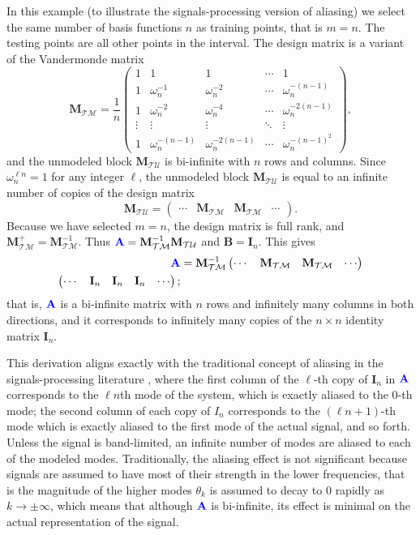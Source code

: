 \documentclass[twocolumn,aps,prx,superscriptaddress,10pt]{revtex4-2}
\newcommand{\0}{\bm{0}}
\newcommand{\M}{\mathcal{M}} %
\newcommand{\T}{\mathcal{T}} %
\newcommand{\U}{\mathcal{U}} %
\newcommand{\bbA}{{\color{blue}{\mathbf{A}}}}  %
\newcommand{\bbB}{\mathbf{B}}
\newcommand{\bbI}{\mathbf{I}}
\newcommand{\bbM}{\mathbf{M}}
\newcommand{\MTM}{\bbM_{\T\M}}
\newcommand{\MTU}{\bbM_{\T\U}}
\begin{document}
In this example (to illustrate the signals-processing version of aliasing) we select the same number of basis functions $n$ as training points, that is  $m=n$.  The testing points are all other points in the interval. 
The design matrix is a variant of the Vandermonde matrix 
\begin{equation}
    \MTM = \frac{1}{n}\begin{pmatrix}
        1 & 1 & 1 & \cdots & 1\\
        1 & \omega_n^{-1} & \omega_n^{-2} & \cdots & \omega_n^{-(n-1)}\\
        1 & \omega_n^{-2} & \omega_n^{-4} & \cdots & \omega_n^{-2(n-1)}\\
        \vdots & \vdots & \vdots & \ddots & \vdots\\
        1 & \omega_n^{-(n-1)} & \omega_n^{-2(n-1)} & \cdots & \omega_n^{-(n-1)^2}
    \end{pmatrix},
\end{equation}
and the unmodeled block  $\MTU$ is bi-infinite with $n$ rows and columns. 
Since  $\omega_n^{\ell n} = 1$ for any integer $\ell$, the unmodeled block $\MTU$ is equal to an infinite number of copies of the design matrix
\[
\MTU = \begin{pmatrix}\cdots & \MTM & \MTM & \cdots \end{pmatrix}.
\]
Because we have selected $m=n$, the design matrix is full rank, and $\MTM^+ = \MTM^{-1}$.  
Thus $\bbA = \MTM^{-1} \MTU$ and $\bbB = \bbI_n$. 
This gives 
\begin{align}
    \bbA 
    &= \MTM^{-1} \begin{pmatrix} \cdots & \MTM & \MTM & \cdots \end{pmatrix} \\   
    \begin{pmatrix}
      \cdots &   \bbI_n & \bbI_n & \bbI_n & \cdots
    \end{pmatrix};
\end{align}
that is, $\bbA$ is a bi-infinite matrix  with $n$ rows and infinitely many columns in both directions, and it corresponds to infinitely many copies of the $n\times n$ identity matrix $\bbI_n$.

This derivation aligns exactly with the traditional concept of aliasing in the signals-processing literature \cite{roberts1987digital}, where the first column of the $\ell$-th copy of $\bbI_n$ in $\bbA$ corresponds to the $\ell n$th mode of the system, which is exactly aliased to the $0$-th mode; the second column of each copy of $I_n$ corresponds to the $(\ell n+1)$-th mode which is exactly aliased to the first mode of the actual signal, and so forth.  Unless the signal is band-limited, an infinite number of modes are aliased to each of the modeled modes.  Traditionally, the aliasing effect is not significant because signals are assumed to have most of their strength in the lower frequencies, that is the magnitude of the higher modes $\theta_k$ is assumed to decay to $0$ rapidly as $k\rightarrow \pm\infty$, which means that although $\bbA$ is bi-infinite, its effect is minimal on the actual representation of the signal.
\end{document}

